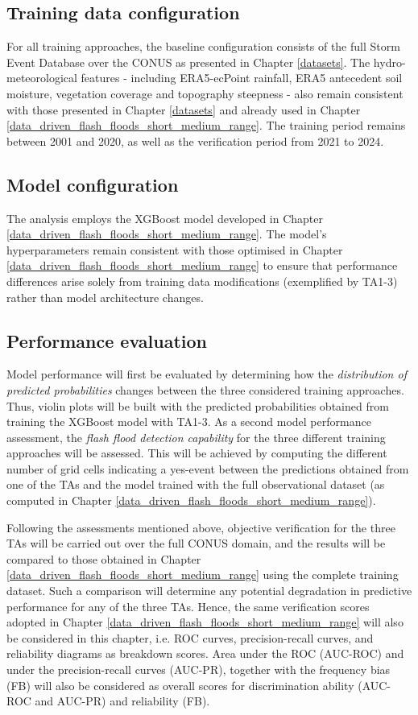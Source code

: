 \subsection{Training data configuration}
For all training approaches, the baseline configuration consists of the full Storm Event Database over the CONUS as presented in Chapter \ref{datasets}. The hydro-meteorological features - including ERA5-ecPoint rainfall, ERA5 antecedent soil moisture, vegetation coverage and topography steepness - also remain consistent with those presented in Chapter \ref{datasets} and already used in Chapter \ref{data_driven_flash_floods_short_medium_range}. The training period remains between 2001 and 2020, as well as the verification period from 2021 to 2024.

\subsection{Model configuration}
The analysis employs the XGBoost model developed in Chapter \ref{data_driven_flash_floods_short_medium_range}. The model's hyperparameters remain consistent with those optimised in Chapter \ref{data_driven_flash_floods_short_medium_range} to ensure that performance differences arise solely from training data modifications (exemplified by TA1-3) rather than model architecture changes. 
 
\subsection{Performance evaluation}

Model performance will first be evaluated by determining how the \textit{distribution of predicted probabilities} changes between the three considered training approaches. Thus, violin plots will be built with the predicted probabilities obtained from training the XGBoost model with TA1-3. As a second model performance assessment, the \textit{flash flood detection capability} for the three different training approaches will be assessed. This will be achieved by computing the different number of grid cells indicating a yes-event between the predictions obtained from one of the TAs and the model trained with the full observational dataset (as computed in Chapter \ref{data_driven_flash_floods_short_medium_range}).

Following the assessments mentioned above, objective verification for the three TAs will be carried out over the full CONUS domain, and the results will be compared to those obtained in Chapter \ref{data_driven_flash_floods_short_medium_range} using the complete training dataset. Such a comparison will determine any potential degradation in predictive performance for any of the three TAs. Hence, the same verification scores adopted in Chapter \ref{data_driven_flash_floods_short_medium_range} will also be considered in this chapter, i.e. ROC curves, precision-recall curves, and reliability diagrams as breakdown scores. Area under the ROC (AUC-ROC) and under the precision-recall curves (AUC-PR), together with the frequency bias (FB) will also be considered as overall scores for discrimination ability (AUC-ROC and AUC-PR) and reliability (FB).
 
